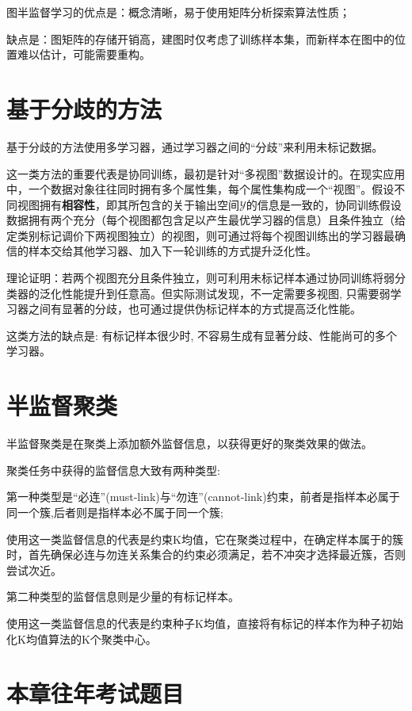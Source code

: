 
图半监督学习的优点是：概念清晰，易于使用矩阵分析探索算法性质；

缺点是：图矩阵的存储开销高，建图时仅考虑了训练样本集，而新样本在图中的位置难以估计，可能需要重构。

\section{基于分歧的方法}\label{sec:12.5}

基于分歧的方法使用多学习器，通过学习器之间的“分歧”来利用未标记数据。

这一类方法的重要代表是协同训练，最初是针对“多视图”数据设计的。在现实应用中，一个数据对象往往同时拥有多个属性集，每个属性集构成一个“视图”。假设不同视图拥有\textbf{相容性}，即其所包含的关于输出空间$\mathcal{Y}$的信息是一致的，协同训练假设数据拥有两个充分（每个视图都包含足以产生最优学习器的信息）且条件独立（给定类别标记调价下两视图独立）的视图，则可通过将每个视图训练出的学习器最确信的样本交给其他学习器、加入下一轮训练的方式提升泛化性。

理论证明：若两个视图充分且条件独立，则可利用未标记样本通过协同训练将弱分类器的泛化性能提升到任意高。但实际测试发现，不一定需要多视图, 只需要弱学习器之间有显著的分歧，也可通过提供伪标记样本的方式提高泛化性能。

这类方法的缺点是: 有标记样本很少时, 不容易生成有显著分歧、性能尚可的多个学习器。

\section{半监督聚类}\label{sec:12.6}
半监督聚类是在聚类上添加额外监督信息，以获得更好的聚类效果的做法。

聚类任务中获得的监督信息大致有两种类型:

第一种类型是“必连”(must-link)与“勿连”(cannot-link)约束，前者是指样本必属于同一个簇,后者则是指样本必不属于同一个簇;

使用这一类监督信息的代表是约束K均值，它在聚类过程中，在确定样本属于的簇时，首先确保必连与勿连关系集合的约束必须满足，若不冲突才选择最近簇，否则尝试次近。

第二种类型的监督信息则是少量的有标记样本。

使用这一类监督信息的代表是约束种子K均值，直接将有标记的样本作为种子初始化K均值算法的K个聚类中心。

\section{本章往年考试题目}\label{sec:12.7}

